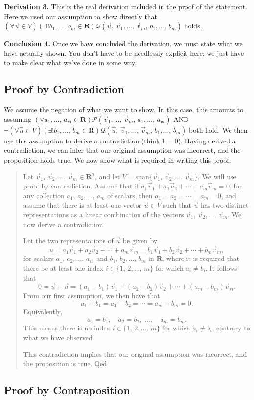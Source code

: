 \documentclass[a4paper,11pt]{article}
\newcommand{\R}{\mathbf{R}}
\newcommand{\PP}{\mathscr{P}}
\newcommand{\QQ}{\mathscr{Q}}
\begin{document}
{\bf Derivation 3.} This is the real derivation included in the proof of the
statement. Here we used our assumption to show directly that $(\forall\vec u \in
V)(\exists!b_1,\dots,\,b_m \in \R)\QQ(\vec u,\,\vec v_1,\dots,\,\vec
v_m,\,b_1,\dots,\,b_m)$ holds.

{\bf Conclusion 4.} Once we have concluded the derivation, we must state what we
have actually shown. You don't have to be needlessly explicit here; we just have
to make clear what we've done in some way.

\subsection*{Proof by Contradiction}

We assume the negation of what we want to show. In this case, this amounts to
assuming $(\forall a_1,\dots,\,a_m \in \R)\PP(\vec v_1,\dots,\,\vec
v_m,\,a_1,\dots,\,a_m)$ AND $\neg(\forall\vec u \in V)(\exists!b_1,\dots,\,b_m
\in \R)\QQ(\vec u,\,\vec v_1,\dots,\,\vec v_m,\,b_1,\dots,\,b_m)$ both hold. We
then use this assumption to derive a contradiction (think $1=0$). Having derived
a contradiction, we can infer that our original assumption was incorrect, and
the proposition holds true. We now show what is required in writing this proof.

\begin{quotation}
  Let $\vec v_1,\,\vec v_2,\dots,\,\vec v_m \in \R^n$, and let
  $V=\text{span}\{\vec v_1,\,\vec v_2,\dots,\,\vec v_m\}$. We will use proof by
  contradiction. Assume that if $a_1\vec v_1 + a_2\vec v_2 + \cdots + a_m\vec
  v_m = 0$, for any collection $a_1,\,a_2,\dots,\,a_m$ of scalars, then
  $a_1=a_2=\cdots=a_m=0$, and assume that there is at least one vector $\vec u
  \in V$ such that $\vec u$ has two distinct representations as a linear
  combination of the vectors $\vec v_1,\,\vec v_2,\dots,\,\vec v_m$. We now
  derive a contradiction.

  Let the two representations of $\vec u$ be given by
  \[
    u = a_1\vec v_1 + a_2\vec v_2 + \cdots + a_m\vec v_m =
    b_1\vec v_1 + b_2\vec v_2 + \cdots + b_m\vec v_m,
  \]
  for scalars $a_1,\,a_2,\dots,\,a_m$ and $b_1,\,b_2,\dots,\,b_m$ in $\R$, where
  it is required that there be at least one index $i \in \{1,\,2,\dots,\,m\}$
  for which $a_i \neq b_i$. It follows that
  \[
    0 = \vec u-\vec u =
    (a_1-b_1)\vec v_1 + (a_2-b_2)\vec v_2 + \cdots + (a_m-b_m)\vec v_m.
  \]
  From our first assumption, we then have that
  \[
    a_1-b_1=a_2-b_2=\cdots=a_m-b_m=0.
  \]
  Equivalently,
  \[
    a_1=b_1, \quad a_2=b_2,\;\dots,\quad a_m=b_m.
  \]
  This means there is no index $i \in \{1,\,2,\dots,\,m\}$ for which $a_i \neq
  b_i$, contrary to what we have observed.

  This contradiction implies that our original assumption was incorrect, and the
  proposition is true.
  \hfill{\sc Qed}
\end{quotation}

\subsection*{Proof by Contraposition}
\end{document}
